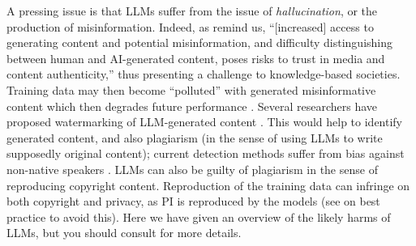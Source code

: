 A pressing issue is that LLMs suffer from the issue of \textit{hallucination}, or the production of misinformation.
Indeed, as \citet{Solaiman_Evaluating_2024} remind us, ``[increased] access to generating content and potential misinformation, and difficulty distinguishing between human and AI-generated content, poses risks to trust in media and content authenticity,'' thus presenting a challenge to knowledge-based societies. Training data may then become ``polluted'' with generated misinformative content which then degrades future performance \citep{pan_risk_2023}. Several researchers have proposed watermarking of LLM-generated content \cite{kirchenbauer_watermark_2023, grinbaum_ethical_2022}. This would help to identify generated content, and also plagiarism (in the sense of using LLMs to write supposedly original content); current detection methods suffer from bias against non-native speakers \citep{liang_gpt_2023}. LLMs can also be guilty of plagiarism in the sense of reproducing copyright content. Reproduction of the training data can infringe on both copyright and privacy, as PI is reproduced by the models \citep{lee_language_2022, huang_are_2022, lukas_analyzing_2023} (see  on best practice to avoid this). 
Here we have given an overview of the likely harms of LLMs, but you should consult \citet{Solaiman_Evaluating_2024,weidinger_ethical_2021, kumar_language_2022} for more details. %





